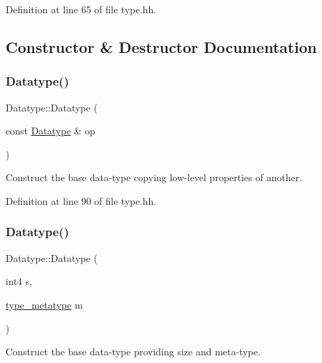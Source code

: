 Definition at line 65 of file type.\+hh.



\subsection{Constructor \& Destructor Documentation}
\mbox{\label{class_datatype_adfdb65c6dc4d64cafc7e042003f183ef}} 
\subsubsection{\texorpdfstring{Datatype()}{Datatype()}\hspace{0.1cm}{\footnotesize\ttfamily [1/3]}}
{\footnotesize\ttfamily Datatype\+::\+Datatype (\begin{DoxyParamCaption}\item[{const \mbox{\hyperlink{class_datatype}{Datatype}} \&}]{op }\end{DoxyParamCaption})\hspace{0.3cm}{\ttfamily [inline]}}



Construct the base data-\/type copying low-\/level properties of another. 



Definition at line 90 of file type.\+hh.

\mbox{\label{class_datatype_a29369e9251cfb318325b48f715f2aa7f}} 
\subsubsection{\texorpdfstring{Datatype()}{Datatype()}\hspace{0.1cm}{\footnotesize\ttfamily [2/3]}}
{\footnotesize\ttfamily Datatype\+::\+Datatype (\begin{DoxyParamCaption}\item[{int4}]{s,  }\item[{\mbox{\hyperlink{type_8hh_aef6429f2523cdf4d415ba04a0209e61f}{type\+\_\+metatype}}}]{m }\end{DoxyParamCaption})\hspace{0.3cm}{\ttfamily [inline]}}



Construct the base data-\/type providing size and meta-\/type. 



